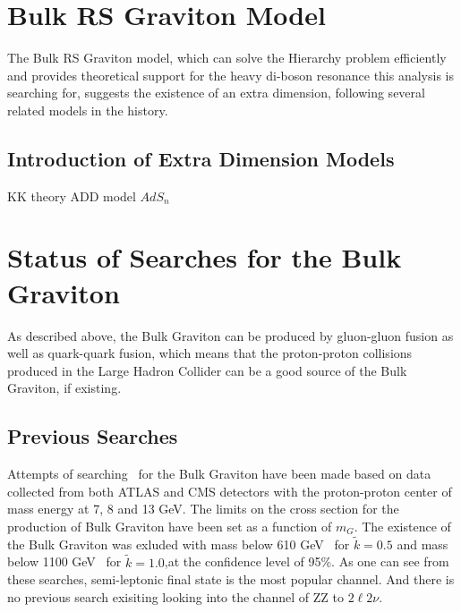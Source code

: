 \section{Bulk RS Graviton Model}
The Bulk RS Graviton model, which can solve the Hierarchy problem efficiently and provides theoretical support for the heavy di-boson resonance this analysis is searching for, suggests the existence of an extra dimension, following several related models in the history.
\subsection{Introduction of Extra Dimension Models}
KK theory
ADD model
$AdS_{n}$

\section{Status of Searches for the Bulk Graviton}
As described above, the Bulk Graviton can be produced by gluon-gluon fusion as well as quark-quark fusion, which means that the proton-proton collisions produced in the Large Hadron Collider can be a good source of the Bulk Graviton, if existing. 
\subsection{Previous Searches}
Attempts of searching~\cite{Aad:2012nev,Aad:2013wxa,Aad:2014xka,Chatrchyan:2012baa,Khachatryan:2014gha,Aaboud:2016okv} for the Bulk Graviton have been made based on data collected from both ATLAS and CMS detectors with the proton-proton center of mass energy at 7, 8 and 13 GeV. The limits on the cross section for the production of Bulk Graviton have been set as a function of $m_{G}$. The existence of the Bulk Graviton was exluded with mass below 610 GeV~\cite{Chatrchyan:2012baa} for $\tilde{k}=0.5$ and mass below 1100 GeV~\cite{Aaboud:2016okv} for $\tilde{k}=1.0$,at the confidence level of 95\%. As one can see from these searches, semi-leptonic final state is the most popular channel. And there is no previous search exisiting looking into the channel of ZZ to $2\ell 2\nu$.
